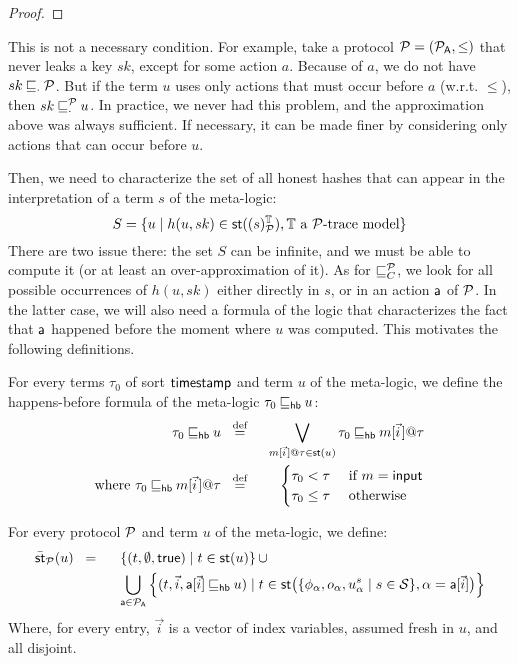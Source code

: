 \begin{proof}
\end{proof}

\begin{remark}
  This is not a necessary condition. For example, take a protocol $\mathcal{P} = (\mathcal{P}_{\textsf{A}},\le)$ that never leaks a key $sk$, except for some action $a$. Because of $a$, we do not have $sk \mathbin{\sqsubseteq}_{\cdot} \mathcal{P}$. But if the term $u$ uses only actions that must occur before $a$ (w.r.t. $\le$), then $sk \mathbin{\sqsubseteq}^{\mathcal{P}}_{\cdot} u$. In practice, we never had this problem, and the approximation above was always sufficient. If necessary, it can be made finer by considering only actions that can occur before $u$.
\end{remark}

Then, we need to characterize the set of all honest hashes that can appear in the interpretation of a term $s$ of the meta-logic:
\[
  S = \{u \mid h(u,sk) \in \mathsf{st}((s)^{\mathbb{T}}_{\mathcal{P}}),
  \mathbb{T} \text{ a $\mathcal{P}$-trace model}\}
\]
There are two issue there: the set $S$ can be infinite, and we must be able to compute it (or at least an over-approximation of it). As for $\mathbin{\sqsubseteq}^{\mathcal{P}}_{C}$, we look for all possible occurrences of $h(u,sk)$ either directly in $s$, or in an action $\textsf{a}$ of $\mathcal{P}$. In the latter case, we will also need a formula of the logic that characterizes the fact that $\textsf{a}$ happened before the moment where $u$ was computed. This motivates the following definitions.

\begin{definition}
  For every terms $\tau_0$ of sort $\textsf{timestamp}$ and term $u$ of the meta-logic, we define the happens-before formula of the meta-logic $\tau_0 \mathbin{\sqsubseteq_{\textsf{hb}}} u$:
  \begin{alignat*}{2}
    \tau_0 \lehb u &\;\;\overset{\text{def}}{=}\;\;&
    \bigvee_{m[\pvec{i}]@\tau \in \st(u)}
    \tau_0 \lehb m[\pvec{i}]@\tau\\
    \text{where }\tau_0 \lehb m[\pvec{i}]@\tau  &\;\;\overset{\text{def}}{=}\;\;&
    \begin{cases}
      \tau_0 < \tau &\text{ if } m = \minp\\
      \tau_0 \le \tau &\text{ otherwise}
    \end{cases}
  \end{alignat*} 
\end{definition}

\begin{definition}
  For every protocol $\mathcal{P}$ and term $u$ of the meta-logic, we define:
  \begin{alignat*}{2}
    \bar{\mathsf{st}}_{\mathcal{P}}(u) &\;\;=\;\;&&
    \left\{
      (t, \emptyset, \textsf{true}) \mid t \in \mathsf{st}(u)
    \right\}
    \cup\\
    &&&\bigcup_{\textsf{a} \in \mathcal{P}_{\textsf{A}}}
    \left\{
      (t, \vec{i}, \textsf{a}[\vec{i}] \mathbin{\sqsubseteq_{\textsf{hb}}} u) \mid
      t \in \mathsf{st}\big(\{\phi_{\alpha},o_{\alpha},u^s_{\alpha} \mid s \in\mathcal{S}\},
      \alpha = \textsf{a}[\vec{i}]
      \big)
    \right\}
  \end{alignat*}
  Where, for every entry, $\vec{i}$ is a vector of index variables, assumed fresh in $u$, and all disjoint.
\end{definition}

